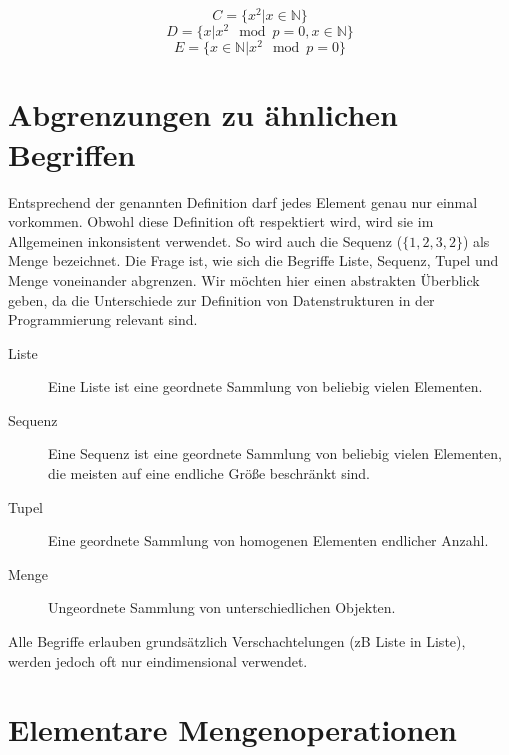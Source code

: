 \[
    C = \{x^2 | x \in \mathbb{N}\}
\] \[
    D = \{x | x^2 \mod{p} = 0, x \in \mathbb{N}\}
\] \[
    E = \{x \in \mathbb{N} | x^2 \mod{p} = 0\}
\]

\section{Abgrenzungen zu ähnlichen Begriffen}
%
Entsprechend der genannten Definition darf jedes Element genau nur einmal vorkommen. Obwohl diese Definition oft respektiert wird, wird sie im Allgemeinen inkonsistent verwendet. So wird auch die Sequenz ($\{1, 2, 3, 2\}$) als Menge bezeichnet. Die Frage ist, wie sich die Begriffe Liste, Sequenz, Tupel und Menge voneinander abgrenzen. Wir möchten hier einen abstrakten Überblick geben, da die Unterschiede zur Definition von Datenstrukturen in der Programmierung relevant sind.
%
\begin{description}
 \item[Liste] Eine Liste ist eine geordnete Sammlung von beliebig vielen Elementen.
 \item[Sequenz] Eine Sequenz ist eine geordnete Sammlung von beliebig vielen Elementen,
                die meisten auf eine endliche Größe beschränkt sind.
 \item[Tupel] Eine geordnete Sammlung von homogenen Elementen endlicher Anzahl.
 \item[Menge] Ungeordnete Sammlung von unterschiedlichen Objekten.
\end{description}

Alle Begriffe erlauben grundsätzlich Verschachtelungen (zB Liste in Liste),
werden jedoch oft nur eindimensional verwendet.

\section{Elementare Mengenoperationen}
%
